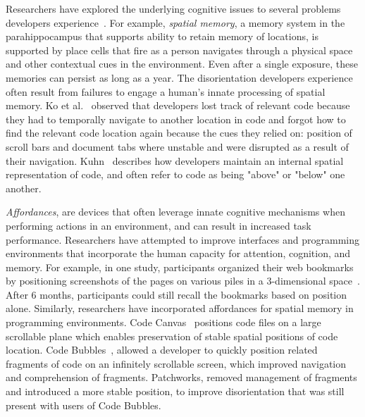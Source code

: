\documentclass[conference]{IEEEtran}
\begin{document}
Researchers have explored the underlying cognitive issues to several problems developers experience~\cite{Parnin:MemoryFailures}.
For example, \emph{spatial memory}, a memory system in the parahippocampus that supports ability to retain memory of locations, is supported by place cells that fire as a person navigates through a physical space and other contextual cues in the environment.  Even after a single exposure, these memories can persist as long as a year.  The disorientation developers experience often result from failures to engage a human's innate processing of spatial memory. Ko et al.~\cite{KoMaintenance06} observed that developers lost track of relevant code because they had to temporally navigate to another location in code and forgot how to find the relevant code location again because the cues they relied on: position of scroll bars and document tabs where unstable and were disrupted as a result of their navigation.  Kuhn~\cite{CodeMaps} describes how developers maintain an internal spatial representation of code, and often refer to code as being "above" or "below" one another.

\emph{Affordances}, are devices that often leverage innate cognitive mechanisms when performing actions in an environment, and can result in increased task performance. 
Researchers have attempted to improve interfaces and programming environments that incorporate the human capacity for attention, cognition, and memory.
For example, in one study, participants organized their web bookmarks by positioning screenshots of the pages on various piles in a 3-dimensional space~\cite{Data Mountain}. 
After 6 months, participants could still recall the bookmarks based on position alone. Similarly, researchers have incorporated affordances for spatial memory in programming environments.  Code Canvas~\cite{DeLine:CodeCanvas} positions code files on a large scrollable plane which enables preservation of stable spatial positions of code location.  Code Bubbles~\cite{Bragdon:CodeBubbles}, allowed a developer to quickly position related fragments of code on an infinitely scrollable screen, which improved navigation and comprehension of fragments.  Patchworks, removed management of fragments and introduced a more stable position, to improve disorientation that was still present with users of Code Bubbles.
\end{document}
